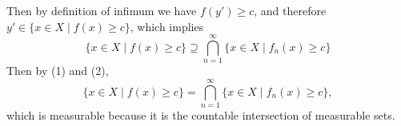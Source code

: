 \begin{enumerate}
\begin{enumerate}[(i)]
        Then by definition of infimum we have $f(y')\ge c$, and therefore $y'\in\{x\in X\mid f(x)\ge c\}$, which implies
        \[
            \{x\in X\mid f(x)\ge c\}\supseteq\bigcap_{n=1}^\infty\{x\in X\mid f_n(x)\ge c\}\tag{2}
        \]
        Then by (1) and (2),
        \[
            \{x\in X\mid f(x)\ge c\}=\bigcap_{n=1}^\infty\{x\in X\mid f_n(x)\ge c\},
        \]
        which is measurable because it is the countable intersection of measurable sets.
        

\end{enumerate}
\end{enumerate}
